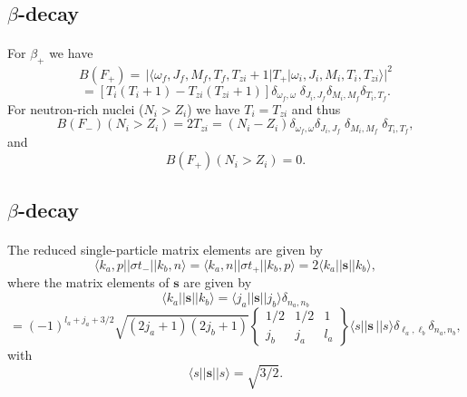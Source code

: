 \documentclass[%
twoside,                 %
final,                   %
10pt]{article}
\begin{document}
\subsection*{$\beta$-decay}

\paragraph{}
For $\beta_{ + }$ we have
\[
B(F_{+}) =\, \vert \langle \omega _{f},J_{f},M_{f},T_{f},T_{zi}+1\vert T_{+}\vert \omega 
_{i},J_{i},M_{i},T_{i},T_{zi}\rangle\vert ^{2}
\]
\[
= [T_{i}(T_{i}+1)-T_{zi}(T_{zi}+1)]
\delta _{\omega _{f},\omega }\;\delta _{J_{i},J_{f}}\delta _{M_{i},M_{f}}\delta _{T_{i},T_{f}}. 
\]
For neutron-rich nuclei ($N_{i}> Z_{i}$) we have $T_{i}=T_{zi}$ and thus
\[
B(F_{-})(N_{i}> Z_{i}) = 2T_{zi} = (N_{i}-Z_{i})\delta _{\omega _{f},\omega }\delta _{J_{i},J_{f}}\;\delta _{M_{i},M_{f}}\;\delta _{T_{i},T_{f}}, 
\]
and
\[
B(F_{+})(N_{i}> Z_{i}) = 0. 
\]



\subsection*{$\beta$-decay}

\paragraph{}
The reduced single-particle
matrix elements are given by
\[
\langle k_{a},p\vert\vert \sigma  t_{-}\vert\vert k_{b},n\rangle=\langle k_{a},n\vert\vert \sigma  t_{+}\vert\vert k_{b},p\rangle= 2\langle k_{a}\vert\vert \mathbf{s}\vert\vert k_{b}\rangle, 
\]
where the matrix elements of $\mathbf{s}$ are given by
\[
\langle k_{a}\vert\vert \mathbf{s}\vert\vert k_{b}\rangle=\langle j_{a}\vert\vert \mathbf{s}\vert\vert j_{b}\rangle \delta_{n_{a},n_{b}}
\]
\[
=(-1)^{l_{a}+j_{a}+3/2}
\sqrt{(2j_{a}+1)(2j_{b}+1)}\left\{\begin{array}{ccc}  {1/2}&  {1/2}&  {1} \\ {j_{b}}&  {j_{a}}&  {l_{a}}\end{array}\right\}
\langle s\vert\vert \mathbf{s}\,\vert\vert s\rangle \delta _{\ell _{a},\ell _{b}} \delta_{n_{a},n_{b}}
,
\]
with
\[
\langle s\vert\vert \mathbf{s}\vert\vert s\rangle= \sqrt{3/2}.
\]



\end{document}

